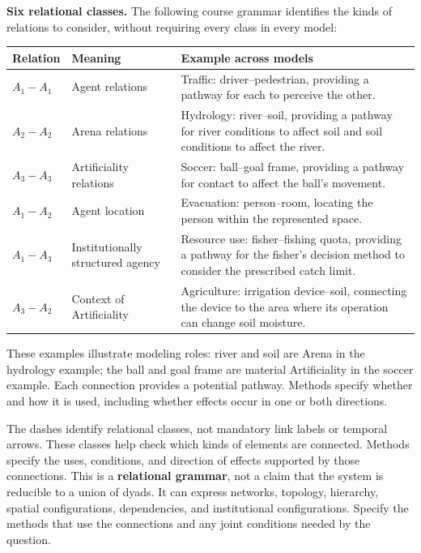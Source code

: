 \documentclass[11pt,a4paper]{article}
\begin{document}
\textbf{Six relational classes.} The following course grammar identifies the kinds of relations to consider, without requiring every class in every model:

\begin{center}
\renewcommand{\arraystretch}{1.2}
\begin{tabularx}{\linewidth}{@{}p{1.7cm}p{4cm}Y@{}}
\toprule
\textbf{Relation} & \textbf{Meaning} & \textbf{Example across models}\\
\midrule
$A_1-A_1$ & Agent relations & Traffic: driver--pedestrian, providing a pathway for each to perceive the other.\\
$A_2-A_2$ & Arena relations & Hydrology: river--soil, providing a pathway for river conditions to affect soil and soil conditions to affect the river.\\
$A_3-A_3$ & Artificiality relations & Soccer: ball--goal frame, providing a pathway for contact to affect the ball's movement.\\
$A_1-A_2$ & Agent location & Evacuation: person--room, locating the person within the represented space.\\
$A_1-A_3$ & Institutionally structured agency & Resource use: fisher--fishing quota, providing a pathway for the fisher's decision method to consider the prescribed catch limit.\\
$A_3-A_2$ & Context of Artificiality & Agriculture: irrigation device--soil, connecting the device to the area where its operation can change soil moisture.\\
\bottomrule
\end{tabularx}
\end{center}

These examples illustrate modeling roles: river and soil are Arena in the hydrology example; the ball and goal frame are material Artificiality in the soccer example. Each connection provides a potential pathway. Methods specify whether and how it is used, including whether effects occur in one or both directions.

The dashes identify relational classes, not mandatory link labels or temporal arrows. These classes help check which kinds of elements are connected. Methods specify the uses, conditions, and direction of effects supported by those connections. This is a \textbf{relational grammar}, not a claim that the system is reducible to a union of dyads. It can express networks, topology, hierarchy, spatial configurations, dependencies, and institutional configurations. Specify the methods that use the connections and any joint conditions needed by the question.
\end{document}
